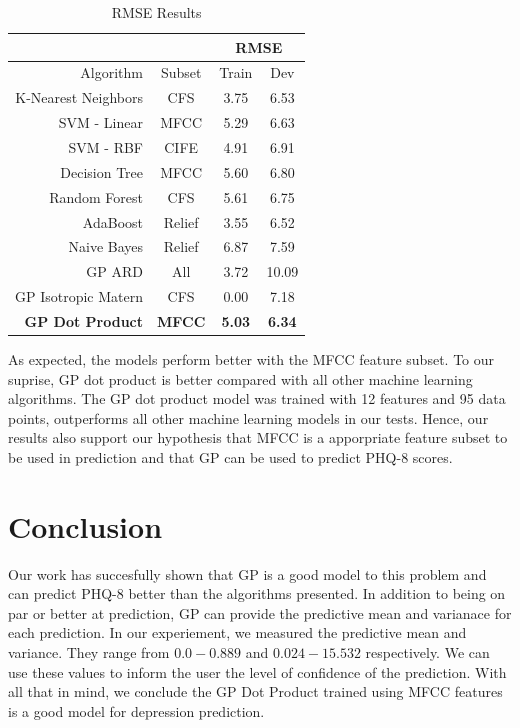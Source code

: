 \documentclass{article}
\begin{document}
	\begin{table}[h]
		\begin{center}
			\begin{tabular}{ | r | c | c | c | }
			\hline
			&& \multicolumn{2}{c|}{RMSE} \\ \hline
			Algorithm 		   & Subset& Train & Dev \\ \hline\hline
			K-Nearest Neighbors   & CFS   & 3.75 & 6.53 \\ \hline
			SVM - Linear          & MFCC  & 5.29 & 6.63 \\ \hline
			SVM - RBF             & CIFE  & 4.91 & 6.91 \\ \hline
			Decision Tree         & MFCC  & 5.60 & 6.80 \\ \hline
			Random Forest         & CFS   & 5.61 & 6.75 \\ \hline
			AdaBoost              & Relief& 3.55 & 6.52 \\ \hline
			Naive Bayes           & Relief& 6.87 & 7.59 \\ \hline
			GP ARD                & All   & 3.72 & 10.09 \\ \hline
			GP Isotropic Matern   & CFS   & 0.00 & 7.18 \\ \hline 
			\bfseries GP Dot Product  & \bfseries MFCC  & \bfseries 5.03 & \bfseries 6.34 \\ \hline
			\end{tabular}
		\end{center}
		\caption{RMSE Results}
		\label{rmse_results}
	\end{table}

As expected, the models perform better with the MFCC feature subset. To our suprise, GP dot product is better compared with all other machine 
learning algorithms. The GP dot product model was trained with 12 features and 95 data points, outperforms all other machine learning models in 
our tests. Hence, our results also support our hypothesis that MFCC is a apporpriate feature subset to be used in prediction and that GP can be used 
to predict PHQ-8 scores.

	\section{Conclusion}	
	Our work has succesfully shown that GP is a good model to this problem and can predict PHQ-8 better than the algorithms presented. In addition to 
	being on par or better at prediction, GP can provide the predictive mean and varianace for each prediction. In our experiement, we measured 
	the predictive mean and variance. They range from $0.0 - 0.889$ and $0.024 - 15.532$ respectively. We can use these values to inform the user the 
	level of confidence of the prediction. With all that in mind, we conclude the GP Dot Product trained using MFCC features is a good model for depression
	prediction.\\
	
\end{document}
